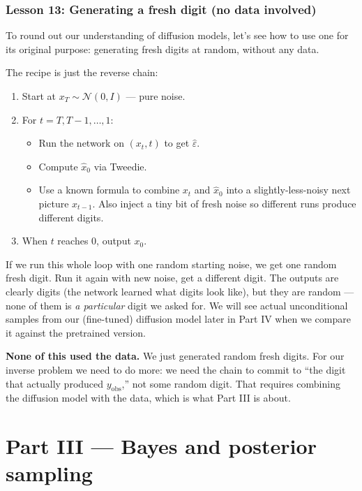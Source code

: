 \documentclass[11pt]{article}
\begin{document}
\section{Lesson 13: Generating a fresh digit (no data involved)}

To round out our understanding of diffusion models, let's see how to
use one for its original purpose: generating fresh digits at random,
without any data.

The recipe is just the reverse chain:
\begin{enumerate}[leftmargin=2em]
\item Start at $x_T \sim \mathcal{N}(0, I)$ --- pure noise.
\item For $t = T, T-1, \ldots, 1$:
  \begin{itemize}[leftmargin=1.5em]
    \item Run the network on $(x_t, t)$ to get $\hat\varepsilon$.
    \item Compute $\hat x_0$ via Tweedie.
    \item Use a known formula to combine $x_t$ and $\hat x_0$ into a
      slightly-less-noisy next picture $x_{t-1}$. Also inject a tiny
      bit of fresh noise so different runs produce different digits.
  \end{itemize}
\item When $t$ reaches $0$, output $x_0$.
\end{enumerate}

If we run this whole loop with one random starting noise, we get one
random fresh digit. Run it again with new noise, get a different
digit. The outputs are clearly digits (the network learned what digits
look like), but they are random --- none of them is \emph{a particular}
digit we asked for. We will see actual unconditional samples from our
(fine-tuned) diffusion model later in Part IV when we compare it
against the pretrained version.

\textbf{None of this used the data.} We just generated random fresh
digits. For our inverse problem we need to do more: we need the chain
to commit to ``the digit that actually produced $y_{\text{obs}}$,''
not some random digit. That requires combining the diffusion model with
the data, which is what Part III is about.

\part*{Part III --- Bayes and posterior sampling}
\end{document}
